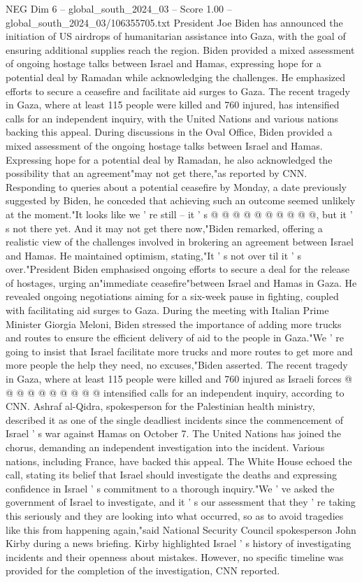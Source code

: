 \begin{textsample}{NEG Dim 6 – global\_south\_2024\_03 – Score 1.00 – global\_south\_2024\_03/106355705.txt}  \label{ex:f6_neg_394}
President Joe Biden has announced the initiation of US airdrops of humanitarian assistance into Gaza, with the goal of ensuring additional supplies reach the region.
Biden provided a mixed assessment of ongoing hostage talks between Israel and Hamas, expressing hope for a potential deal by Ramadan while acknowledging the challenges.
He emphasized efforts to secure a ceasefire and facilitate aid surges to Gaza.
The recent tragedy in Gaza, where at least 115 people were killed and 760 injured, has intensified calls for an independent inquiry, with the United Nations and various nations backing this appeal.
During discussions in the Oval Office, Biden provided a mixed assessment of the ongoing hostage talks between Israel and Hamas.
Expressing hope for a potential deal by Ramadan, he also acknowledged the possibility that an agreement"may not get there,"as reported by CNN.
Responding to queries about a potential ceasefire by Monday, a date previously suggested by Biden, he conceded that achieving such an outcome seemed unlikely at the moment."It looks like we ' re still -- it ' s @ @ @ @ @ @ @ @ @ @, but it ' s not there yet.
And it may not get there now,"Biden remarked, offering a realistic view of the challenges involved in brokering an agreement between Israel and Hamas.
He maintained optimism, stating,"It ' s not over til it ' s over."President Biden emphasised ongoing efforts to secure a deal for the release of hostages, urging an"immediate ceasefire"between Israel and Hamas in Gaza.
He revealed ongoing negotiations aiming for a six-week pause in fighting, coupled with facilitating aid surges to Gaza.
During the meeting with Italian Prime Minister Giorgia Meloni, Biden stressed the importance of adding more trucks and routes to ensure the efficient delivery of aid to the people in Gaza."We ' re going to insist that Israel facilitate more trucks and more routes to get more and more people the help they need, no excuses,"Biden asserted.
The recent tragedy in Gaza, where at least 115 people were killed and 760 injured as Israeli forces @ @ @ @ @ @ @ @ @ @ intensified calls for an independent inquiry, according to CNN.
Ashraf al-Qidra, spokesperson for the Palestinian health ministry, described it as one of the single deadliest incidents since the commencement of Israel ' s war against Hamas on October 7.
The United Nations has joined the chorus, demanding an independent investigation into the incident.
Various nations, including France, have backed this appeal.
The White House echoed the call, stating its belief that Israel should investigate the deaths and expressing confidence in Israel ' s commitment to a thorough inquiry."We ' ve asked the government of Israel to investigate, and it ' s our assessment that they ' re taking this seriously and they are looking into what occurred, so as to avoid tragedies like this from happening again,"said National Security Council spokesperson John Kirby during a news briefing.
Kirby highlighted Israel ' s history of investigating incidents and their openness about mistakes.
However, no specific timeline was provided for the completion of the investigation, CNN reported.

\end{textsample}
